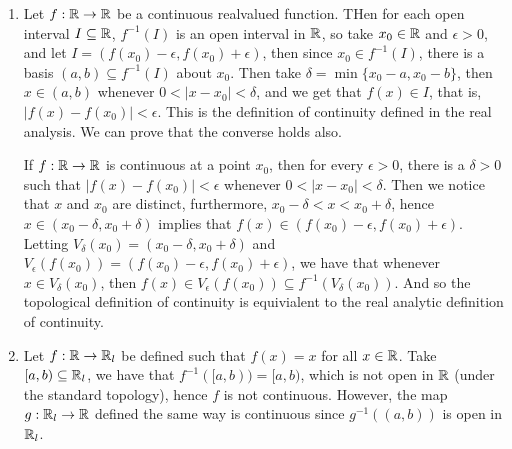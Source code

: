 \begin{example}
    \begin{enumerate}[label=(\arabic*)]
        \item Let $f:\mathbb{R} \rightarrow \mathbb{R}$ be a continuous realvalued function.
            THen for each open interval  $I \subseteq \mathbb{R}$,  $f^{-1}(I)$ is an
            open interval in  $\mathbb{R}$, so take  $x_0 \in \mathbb{R}$ and $\epsilon>0$, and
            let $I=(f(x_0)-\epsilon,f(x_0)+\epsilon)$, then since $ x_0 \in
            f^{-1}(I)$, there is a basis $(a,b) \subseteq f^{-1}(I)$ about
            $x_0$. Then take  $\delta=\min\{x_0-a,x_0-b\}$, then $x \in (a,b)$
            whenever $0<|x-x_0|<\delta$, and we get that $f(x) \in I$, that is,
            $|f(x)-f(x_0)|<\epsilon$. This is the definition of continuity
            defined in the real analysis. We can prove that the converse holds
            also.

            If $f:\mathbb{R} \rightarrow \mathbb{R}$ is continuous at a point $x_0$, then for
            every $\epsilon>0$, there is a  $\delta>0$ such that
            $|f(x)-f(x_0)|<\epsilon$ whenever $0<|x-x_0|<\delta$. Then we notice
            that $x$ and  $ x_0$ are distinct, furthermore, $x_0-\delta<x
            <x_0+\delta$, hence $x \in (x_0-\delta,x_0+\delta)$ implies that
            $f(x) \in (f(x_0)-\epsilon,f(x_0)+\epsilon)$. Letting
            $V_{\delta}(x_0)=(x_0-\delta,x_0+\delta) $ and
            $V_{\epsilon}(f(x_0))=(f(x_0)-\epsilon,f(x_0)+\epsilon)$, we have
            that whenever  $x \in V_{\delta}(x_0)$, then $f(x) \in
            V_{\epsilon}(f(x_0)) \subseteq f^{-1}(V_{\delta}(x_0))$. And so the
            topological definition of continuity is equivialent to the real
            analytic definition of continuity.

        \item Let $f:\mathbb{R} \rightarrow \mathbb{R}_l$ be defined such that  $f(x)=x$ for all
            $x \in \mathbb{R}$. Take  $[a,b) \subseteq \mathbb{R}_l$, we have that
            $f^{-1}([a,b))=[a,b)$, which is not open in  $\mathbb{R}$  (under the
            standard topology), hence $f$ is not continuous. However, the map
            $g:\mathbb{R}_l \rightarrow \mathbb{R}$ defined the same way is continuous since
            $g^{-1}((a,b))$ is open in  $\mathbb{R}_l$.
    \end{enumerate}
\end{example} 

